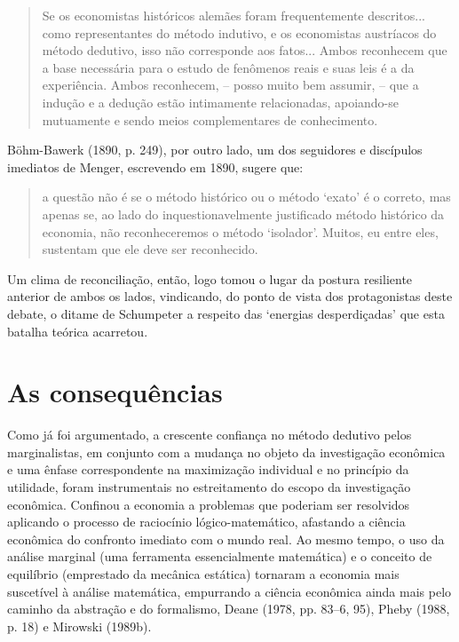 \documentclass[12pt]{article}
\begin{document}
\begin{quote}
Se os economistas históricos alemães foram frequentemente descritos... como representantes do método indutivo, e os economistas austríacos do método dedutivo, isso não corresponde aos fatos... Ambos reconhecem que a base necessária para o estudo de fenômenos reais e suas leis é a da experiência. Ambos reconhecem, – posso muito bem assumir, – que a indução e a dedução estão intimamente relacionadas, apoiando-se mutuamente e sendo meios complementares de conhecimento.
\end{quote}

Böhm-Bawerk (1890, p. 249), por outro lado, um dos seguidores e discípulos imediatos de Menger, escrevendo em 1890, sugere que:

\begin{quote}
a questão não é se o método histórico ou o método ‘exato’ é o correto, mas apenas se, ao lado do inquestionavelmente justificado método histórico da economia, não reconheceremos o método ‘isolador’. Muitos, eu entre eles, sustentam que ele deve ser reconhecido.
\end{quote}

Um clima de reconciliação, então, logo tomou o lugar da postura resiliente anterior de ambos os lados, vindicando, do ponto de vista dos protagonistas deste debate, o ditame de Schumpeter a respeito das ‘energias desperdiçadas’ que esta batalha teórica acarretou.

\section{As consequências}

Como já foi argumentado, a crescente confiança no método dedutivo pelos marginalistas, em conjunto com a mudança no objeto da investigação econômica e uma ênfase correspondente na maximização individual e no princípio da utilidade, foram instrumentais no estreitamento do escopo da investigação econômica. Confinou a economia a problemas que poderiam ser resolvidos aplicando o processo de raciocínio lógico-matemático, afastando a ciência econômica do confronto imediato com o mundo real. Ao mesmo tempo, o uso da análise marginal (uma ferramenta essencialmente matemática) e o conceito de equilíbrio (emprestado da mecânica estática) tornaram a economia mais suscetível à análise matemática, empurrando a ciência econômica ainda mais pelo caminho da abstração e do formalismo, Deane (1978, pp. 83–6, 95), Pheby (1988, p. 18) e Mirowski (1989b).
\end{document}
